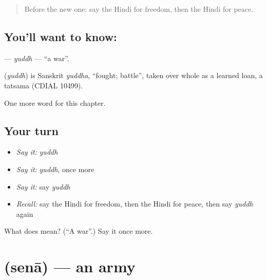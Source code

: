 \label{lesson:HI-C219-yuddh}



\begin{quote}
Before the new one: say the Hindi for freedom, then the Hindi for peace.
\end{quote}

\subsection*{You'll want to know: }
\textbf{} — \emph{yuddh} — \textquotedblleft{}a war\textquotedblright{}.

\begin{cousinweb}
\textbf{} (\emph{yuddh}) is Sanskrit \emph{yuddha}, \textquotedblleft{}fought; battle\textquotedblright{}, taken over whole as a learned loan, a tatsama (CDIAL 10499).
\end{cousinweb}

\begin{grammarlens}[title={What you've built}]
One more word for this chapter.
\end{grammarlens}

\subsection*{Your turn}
\begin{itemize}
\raggedright
  \item \emph{Say it:} \emph{yuddh}
  \item \emph{Say it:} \emph{yuddh}, once more
  \item \emph{Say it:} say \emph{yuddh}
  \item \emph{Recall:} say the Hindi for freedom, then the Hindi for peace, then say \emph{yuddh} again
\end{itemize}

\begin{tcolorbox}[breakable,colback=teal!4,colframe=teal!35!black,title={Before you move on}]
What does  mean? (\textquotedblleft{}A war\textquotedblright{}.) Say it once more.
\end{tcolorbox}
\section[\texorpdfstring{\hi{सेना} (senā)}{सेना (senā)}]{ (senā) — an army}

\label{lesson:HI-C219-sena}



